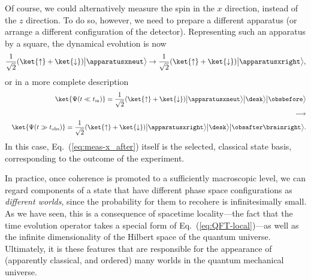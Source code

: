 \documentclass[12pt]{article}
\begin{document}
Of course, we could alternatively measure the spin in the $x$ direction, 
instead of the $z$ direction.  To do so, however, we need to prepare 
a different apparatus (or arrange a different configuration of the detector). 
Representing such an apparatus by a square, the dynamical evolution is now
%
\begin{equation}
  \frac{1}{\sqrt{2}} (\ket{\uparrow} + \ket{\downarrow}) 
    \bigl|\apparatusxneut\bigr>
\rightarrow
  \frac{1}{\sqrt{2}} (\ket{\uparrow} + \ket{\downarrow}) 
    \bigl|\apparatusxright\bigr>,
\label{eq:meas-x_1}
\end{equation}
%
or in a more complete description
%
\begin{eqnarray}
  && \ket{\Psi(t \ll t_{\rm m})} 
  = \frac{1}{\sqrt{2}} (\ket{\uparrow} + \ket{\downarrow}) 
    \bigl|\apparatusxneut\bigr> \bigl|\desk\bigr> \bigl|\obsbefore\bigr>
\label{eq:meas-x_before}\\
  && \!\!\!\!\!\! \longrightarrow
\nonumber\\
  && \ket{\Psi(t \gg t_{\rm obs})} 
  = \frac{1}{\sqrt{2}} (\ket{\uparrow} + \ket{\downarrow}) 
    \bigl|\apparatusxright\bigr> \bigl|\desk\bigr> 
    \bigl|\obsafter\brainright\bigr>.
\label{eq:meas-x_after}
\end{eqnarray}
%
In this case, Eq.~(\ref{eq:meas-x_after}) itself is the selected, classical 
state basis, corresponding to the outcome of the experiment.

In practice, once coherence is promoted to a sufficiently macroscopic 
level, we can regard components of a state that have different phase 
space configurations as {\it different worlds}, since the probability 
for them to recohere is infinitesimally small.  As we have seen, this is 
a consequence of spacetime locality---the fact that the time evolution 
operator takes a special form of Eq.~(\ref{eq:QFT-local})---as well as 
the infinite dimensionality of the Hilbert space of the quantum universe. 
Ultimately, it is these features that are responsible for the appearance 
of (apparently classical, and ordered) many worlds in the quantum 
mechanical universe.
\end{document}
